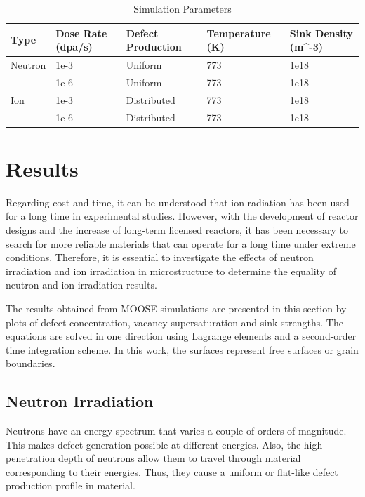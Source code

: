 \documentclass[a4paper]{article}
\begin{document}
\begin{table}[h!]
  \centering
  \caption{Simulation Parameters}
  \label{table:simulation_parameters}
  \begin{tabular}{ ||p{2cm}|p{3cm}|p{3cm}|p{3cm}|p{3cm}||  }
     \hline
     Type & Dose Rate (dpa/s) & Defect Production & Temperature (K) & Sink Density (m^{-3})\\
     \hline
     \hline
     Neutron  & 1e-3  & Uniform     & 773 & 1e18\\
              & 1e-6  & Uniform     & 773 & 1e18\\
     \hline
     Ion      & 1e-3  & Distributed & 773 & 1e18\\
              & 1e-6  & Distributed & 773 & 1e18\\
     \hline
  \end{tabular}
\end{table}

\newpage
\section{Results} \hspace{10pt}

Regarding cost and time, it can be understood that ion radiation has been used for a long time in experimental studies. However, with the development of reactor designs and the increase of long-term licensed reactors, it has been necessary to search for more reliable materials that can operate for a long time under extreme conditions. Therefore, it is essential to investigate the effects of neutron irradiation and ion irradiation in microstructure to determine the equality of neutron and ion irradiation results.

The results obtained from MOOSE simulations are presented in this section by plots of defect concentration, vacancy supersaturation and sink strengths. The equations are solved in one direction using Lagrange elements and a second-order time integration scheme. In this work, the surfaces represent free surfaces or grain boundaries.  %


  \subsection{Neutron Irradiation} \hspace{10pt}
  Neutrons have an energy spectrum that varies a couple of orders of magnitude. This makes defect generation possible at different energies. Also, the high penetration depth of neutrons allow them to travel through material corresponding to their energies. Thus, they cause a uniform or flat-like defect production profile in material.\cite{was2016}
\end{document}
